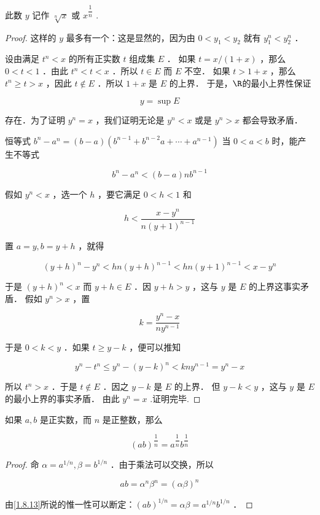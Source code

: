 此数 $y$ 记作 $\sqrt[n]{x}$ 或 $x^{\dfrac{1}{n}}$ .
\begin{proof}
	这样的 $y$ 最多有一个：这是显然的，因为由 $0<y_1<y_2$ 就有 $y_1^n<y_2^n$ ．
	
	设由满足 $t^n<x$ 的所有正实数 $t$ 组成集 $E$ ．
	如果 $t=x /(1+x)$ ，那么 $0<t<1$ ．由此 $t^n<t<x$ ．所以 $t \in E$ 而 $E$ 不空．
	如果 $t>1+x$ ，那么 $t^n \geqslant t > x$ ，因此 $t \notin E$ ．所以 $1+x$ 是 $E$ 的上界．
	于是，$\R$的最小上界性保证
	
	$$
	y=\sup E
	$$
	
	
	存在．为了证明 $y^n=x$ ，我们证明无论是 $y^n<x$ 或是 $y^n>x$ 都会导致矛盾．
	
	恒等式 $b^n-a^n=(b-a)\left(b^{n-1}+b^{n-2} a+\cdots+a^{n-1}\right)$ 当 $0<a<b$ 时，能产生不等式
	
	$$
	b^n-a^n<(b-a) n b^{n-1}
	$$
	
	
	假如 $y^n<x$ ，选一个 $h$ ，要它满足 $0<h<1$ 和
	
	$$
	h<\dfrac{x-y^n}{n(y+1)^{n-1}}
	$$
	
	
	置 $a=y, b=y+h$ ，就得
	
	$$
	(y+h)^n-y^n<h n(y+h)^{n-1}<h n(y+1)^{n-1}<x-y^n
	$$
	
	
	于是 $(y+h)^n<x$ 而 $y+h \in E$ ．因 $y+h>y$ ，这与 $y$ 是 $E$ 的上界这事实矛盾．
	假如 $y^n>x$ ，置
	
	$$
	k=\dfrac{y^n-x}{n y^{n-1}}
	$$
	
	
	于是 $0<k<y$ ．如果 $t \geqslant y-k$ ，便可以推知
	
	$$
	y^n-t^n \leqslant y^n-(y-k)^n<k n y^{n-1}=y^n-x
	$$
	
	
	所以 $t^n>x$ ．于是 $t \notin E$ ．因之 $y-k$ 是 $E$ 的上界．
	但 $y-k<y$ ，这与 $y$ 是 $E$ 的最小上界的事实矛盾．
	由此 $y^n=x$ .证明完毕.
	
\end{proof}
\begin{corollary}
	如果 $a, b$ 是正实数，而 $n$ 是正整数，那么
	
	$$
	(a b)^{\dfrac{1}{n}}=a^{\dfrac{1}{n}} b^{\dfrac{1}{n}}
	$$
	
	
	
\end{corollary}
\begin{proof}
	命 $\alpha=a^{1 / n}, \beta=b^{1 / n}$ ．由于乘法可以交换，所以
	
	$$
	a b=\alpha^n \beta^n=(\alpha \beta)^n
	$$
	
	
	由\ref{1.8.13}所说的惟一性可以断定：$(a b)^{1 / n}=\alpha \beta=a^{1 / n} b^{1 / n}$ ．
	
	
\end{proof}
